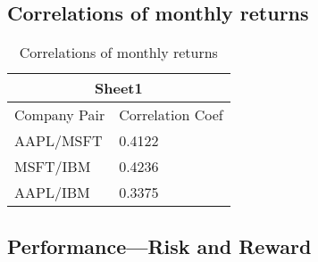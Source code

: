 \documentclass[12pt]{article}
\begin{document}
\subsection{Correlations of monthly returns}
\begin{table}[H]
	\centering
	\caption{Correlations of monthly returns}
	\begin{tabular}{ |p{2.5cm}||p{2cm}| }
		\hline
		\multicolumn{2}{|c|}{Sheet1}\\
		\hline
		Company \text{\quad} Pair & Correlation Coef\\
		\hline
		AAPL/MSFT & 0.4122 \\
		MSFT/IBM & 0.4236\\
		AAPL/IBM & 0.3375\\
		\hline
	\end{tabular}
\end{table}

\subsection{Performance---Risk and Reward}
\end{document}
